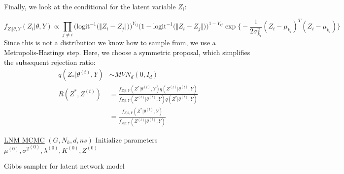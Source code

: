 \documentclass{article}
\begin{document}
Finally, we look at the conditional for the latent variable $Z_i$:

\[f_{Z_i | \theta, Y}(Z_i | \theta, Y) \propto \prod_{j \neq i}\Big(\text{logit}^{-1}\big(\Vert Z_i-Z_j\Vert)\Big)^{Y_{ij}}\Big(1 - \text{logit}^{-1}\big(\Vert Z_i-Z_j\Vert)\Big)^{1 - Y_{ij}} \exp\Big\{-\frac{1}{2\sigma_{k_i}^2}(Z_i - \mu_{k_i})^T( Z_i - \mu_{k_i}) \Big\}\]
Since this is not a distribution we know how to sample from, we use a Metropolis-Hastings step. Here, we choose a symmetric proposal, which simplifies the subsequent rejection ratio:
\begin{align*}
q(Z_* | \theta^{(t)}, Y) &\sim MVN_d(0, I_d) \\
R(Z^*, Z^{(t)}) &= \frac{f_{Z | \theta, Y}(Z^* | \theta^{(t)}, Y)q(Z^{(t)} | \theta^{(t)}, Y)}{f_{Z | \theta, Y}(Z^{(t)} | \theta^{(t)}, Y)q(Z^* | \theta^{(t)}, Y)} \\
&= \frac{f_{Z | \theta, Y}(Z^* | \theta^{(t)}, Y)}{f_{Z | \theta, Y}(Z^{(t)} | \theta^{(t)}, Y)} 
\end{align*}

\begin{algorithm*}
    \underline{LNM MCMC} $(G, N_k, d, ns)$\;
    Initialize  parameters $\mu^{(0)}, {\sigma^2}^{(0)}, \lambda^{(0)}, K^{(0)}, Z^{(0)}$\;
     {
   }

    \caption{Gibbs sampler for latent network model}
\end{algorithm*}
\end{document}
